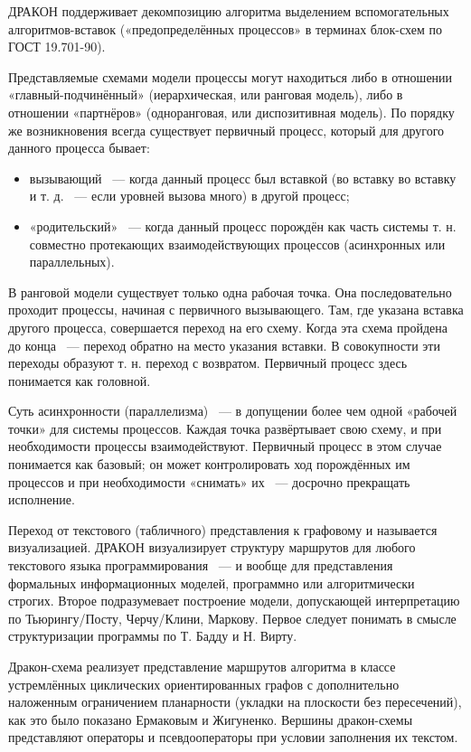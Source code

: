 ДРАКОН поддерживает декомпозицию алгоритма выделением вспомогательных алгоритмов-вставок («предопределённых процессов» в терминах блок-схем по ГОСТ 19.701-90).

Представляемые схемами модели процессы могут находиться либо в отношении «главный-подчинённый» (иерархическая, или ранговая модель), либо в отношении «партнёров» (одноранговая, или диспозитивная модель). По порядку же возникновения всегда существует первичный процесс, который для другого данного процесса бывает:
\begin{itemize}
\item вызывающий ~--- когда данный процесс был вставкой (во вставку во вставку и т. д. ~--- если уровней вызова много) в другой процесс;
\item «родительский» ~--- когда данный процесс порождён как часть системы т. н. совместно протекающих взаимодействующих процессов (асинхронных или параллельных).
\end{itemize}

В ранговой модели существует только одна рабочая точка. Она последовательно проходит процессы, начиная с первичного вызывающего. Там, где указана вставка другого процесса, совершается переход на его схему. Когда эта схема пройдена до конца ~--- переход обратно на место указания вставки. В совокупности эти переходы образуют т. н. переход с возвратом. Первичный процесс здесь понимается как головной.

Суть асинхронности (параллелизма) ~--- в допущении более чем одной «рабочей точки» для системы процессов. Каждая точка развёртывает свою схему, и при необходимости процессы взаимодействуют. Первичный процесс в этом случае понимается как базовый; он может контролировать ход порождённых им процессов и при необходимости «снимать» их ~--- досрочно прекращать исполнение.

Переход от текстового (табличного) представления к графовому и называется визуализацией. ДРАКОН визуализирует структуру маршрутов для любого текстового языка программирования ~--- и вообще для представления формальных информационных моделей, программно или алгоритмически строгих. Второе подразумевает построение модели, допускающей интерпретацию по Тьюрингу/Посту, Черчу/Клини, Маркову. \cite{Parondjanov1} Первое следует понимать в смысле структуризации программы по Т. Бадду и Н. Вирту.

Дракон-схема реализует представление маршрутов алгоритма в классе устремлённых циклических ориентированных графов с дополнительно наложенным ограничением планарности (укладки на плоскости без пересечений), как это было показано Ермаковым и Жигуненко.\cite{Ermakov} Вершины дракон-схемы представляют операторы и псевдооператоры при условии заполнения их текстом.

